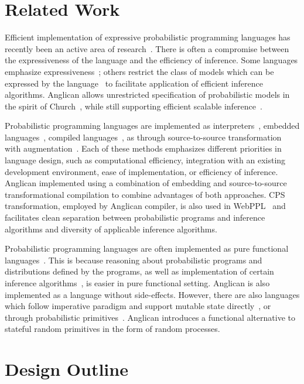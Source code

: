 \documentclass[preprint]{sigplanconf}
\begin{document}
\section{Related Work} \label{sec:related}

Efficient implementation of expressive probabilistic programming
languages has recently been an active area of
research~\cite{MMR+07,GMR+08,P09,MWG+10,MSP14,
SDT14,WVM14,GS15,GSX+16}. There is often a compromise between
the expressiveness of the language and the efficiency of
inference.  Some languages emphasize
expressiveness~\cite{MMR+07,GMR+08,MSP14,GS15}; others restrict
the class of models which can be expressed by the
language~\cite{MWG+10,SDT14,NN14} to facilitate application of
efficient inference algorithms. Anglican allows unrestricted
specification of probabilistic models in the spirit of
Church~\cite{GMR+08}, while still supporting efficient scalable
inference~\cite{WVM14,PWD+14,RNL+2016}.

Probabilistic programming languages are implemented as
interpreters~\cite{GMR+08,MSP14}, embedded
languages~\cite{P09,SGG15,GSX+16}, compiled
languages~\cite{MMR+07,SDT14}, as through source-to-source
transformation with augmentation~\cite{WSG11,GS15}. Each of
these methods emphasizes different priorities in language
design, such as computational efficiency, integration with an
existing development environment, ease of implementation, or
efficiency of inference. Anglican implemented using a
combination of embedding and source-to-source transformational
compilation to combine advantages of both approaches.  CPS
transformation, employed by Anglican compiler, is also used in
WebPPL~\cite{GS15} and facilitates clean separation between
probabilistic programs and inference algorithms and diversity of
applicable inference algorithms.

Probabilistic programming languages are often implemented as
pure functional languages~\cite{GMR+08,MSP14,SGG15}. This is
because reasoning about probabilistic programs and distributions
defined by the programs, as well as implementation of certain
inference algorithms~\cite{MYM+15}, is easier in pure functional
setting. Anglican is also implemented as a language without
side-effects.  However, there are also languages which follow
imperative paradigm and support mutable state
directly~\cite{SDT14,GSX+16}, or through probabilistic
primitives~\cite{GMR+08,MSP14}. Anglican introduces a functional
alternative to stateful random primitives in the form of random
processes.

\section{Design Outline}
\label{sec:design}
\end{document}
